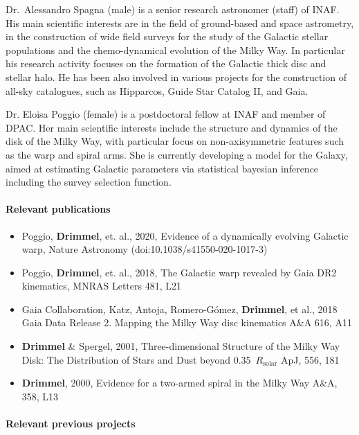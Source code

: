 Dr.~Alessandro Spagna (male) is a senior research astronomer (staff) of INAF. His main scientific interests are in the field of ground-based and space astrometry, in the construction of wide field surveys for the study of the Galactic stellar populations and the chemo-dynamical evolution of the Milky Way. In particular his research activity focuses on the formation of the Galactic thick disc and stellar halo. He has been also involved in various projects for the construction of all-sky catalogues, such as Hipparcos, Guide Star Catalog II, and Gaia. 

Dr. Eloisa Poggio (female) is a postdoctoral fellow at INAF and member of DPAC. Her main scientific interests include the structure and dynamics of the disk of the Milky Way, with particular focus on non-axisymmetric features such as the warp and spiral arms. She is currently developing a model for the Galaxy, aimed at estimating Galactic parameters via statistical bayesian inference including the survey selection function.



\paragraph{Relevant publications}
\begin{itemize}
    \item Poggio, \textbf{Drimmel}, et. al., 2020, Evidence of a dynamically evolving Galactic warp, Nature Astronomy (doi:10.1038/s41550-020-1017-3)
    \item Poggio, \textbf{Drimmel}, et. al., 2018, The Galactic warp revealed by Gaia DR2 kinematics, MNRAS Letters 481, L21
    \item  Gaia Collaboration, Katz, Antoja, Romero-G\'omez, \textbf{Drimmel}, et al., 2018 Gaia Data Release 2. Mapping the Milky Way disc kinematics A\&A 616, A11
    \item \textbf{Drimmel} \& Spergel, 2001, Three-dimensional Structure of the Milky Way Disk: The Distribution of Stars and Dust beyond 0.35~$R_\mathrm{solar}$ ApJ, 556, 181
    \item \textbf{Drimmel}, 2000, Evidence for a two-armed spiral in the Milky Way A\&A, 358, L13
\end{itemize}

\paragraph{Relevant previous projects}

